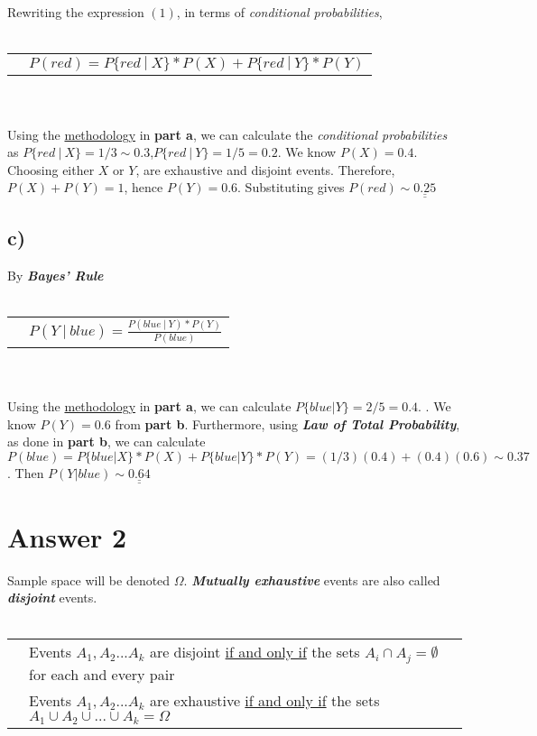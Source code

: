 \documentclass[12pt]{article}
\begin{document}
\\ \\
Rewriting the expression \hyperlink{eq1}{$(1)$}, in terms of \textit{conditional probabilities},
\\ \\
\begin{tabular}{l l}
    & $P(red) = P\{red\ |\ X\}*P(X) + P\{red\ |\ Y\}*P(Y)$\\
\end{tabular}
\\ \\
Using the \hyperlink{method}{methodology} in \textbf{part a}, we can calculate the \textit{conditional probabilities} as
$P\{red\ |\ X\}=1/3\sim 0.3$,$P\{red\ |\ Y\}=1/5=0.2$. We know $P(X)=0.4$.
Choosing either $X$ or $Y$, are exhaustive and disjoint events. Therefore, $P(X)+P(Y)=1$,
hence $P(Y)=0.6$. Substituting gives $P(red)\sim\underline{\underline{0.25}}$

\subsection*{c)}
By \textit{\textbf{Bayes' Rule}}
\\ \\
\begin{tabular}{l l}
    & $P(Y\ |\ blue)=\frac{P(blue\ |\ Y)*P(Y)}{P(blue)}$\\
\end{tabular}
\\ \\
Using the \hyperlink{method}{methodology} in \textbf{part a}, we can calculate $P\{blue|Y\}=2/5=0.4$. . We know
$P(Y)=0.6$ from \textbf{part b}. Furthermore, using \textit{\textbf{Law of Total Probability}}, as done in \textbf{part b},
we can calculate $P(blue) = P\{blue | X\}*P(X) + P\{blue | Y\}*P(Y) = (1/3)(0.4)+(0.4)(0.6)\sim0.37$. Then
$P(Y|blue)\sim \underline{\underline{0.64}}$
\section*{Answer 2}
Sample space will be denoted $\Omega$. 
\textit{\textbf{Mutually exhaustive}} events are also called \textit{\textbf{disjoint}} events.
\\ \\
\begin{tabular}{l l}
    & Events $A_1, A_2 ... A_k$ are disjoint \underline{if and only if} the sets $A_i \cap A_j = \emptyset$ for each and every pair \\
    & Events $A_1, A_2 ... A_k$ are exhaustive \underline{if and only if} the sets $A_1 \cup A_2 \cup... \cup A_k=\Omega$  \\
\end{tabular}
\\ \\
\end{document}
